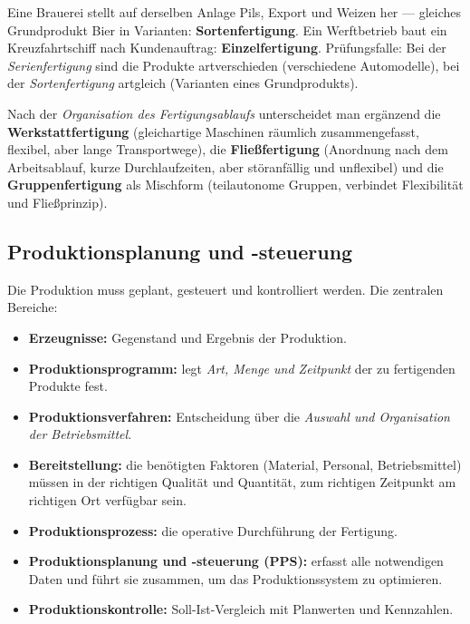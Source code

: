 \documentclass[11pt, a4paper]{article}
\begin{document}
\begin{beispiel}
Eine Brauerei stellt auf derselben Anlage Pils, Export und Weizen her --- gleiches
Grundprodukt Bier in Varianten: \textbf{Sortenfertigung}. Ein Werftbetrieb baut ein
Kreuzfahrtschiff nach Kundenauftrag: \textbf{Einzelfertigung}. Prüfungsfalle: Bei der
\emph{Serienfertigung} sind die Produkte artverschieden (verschiedene Automodelle), bei
der \emph{Sortenfertigung} artgleich (Varianten eines Grundprodukts).
\end{beispiel}

Nach der \emph{Organisation des Fertigungsablaufs} unterscheidet man ergänzend die
\textbf{Werkstattfertigung} (gleichartige Maschinen räumlich zusammengefasst, flexibel,
aber lange Transportwege), die \textbf{Fließfertigung} (Anordnung nach dem
Arbeitsablauf, kurze Durchlaufzeiten, aber störanfällig und unflexibel) und die
\textbf{Gruppenfertigung} als Mischform (teilautonome Gruppen, verbindet Flexibilität
und Fließprinzip).

\subsection{Produktionsplanung und -steuerung}

Die Produktion muss geplant, gesteuert und kontrolliert werden. Die zentralen Bereiche:

\begin{itemize}
  \item \textbf{Erzeugnisse:} Gegenstand und Ergebnis der Produktion.
  \item \textbf{Produktionsprogramm:} legt \emph{Art, Menge und Zeitpunkt} der zu
    fertigenden Produkte fest.
  \item \textbf{Produktionsverfahren:} Entscheidung über die \emph{Auswahl und
    Organisation der Betriebsmittel}.
  \item \textbf{Bereitstellung:} die benötigten Faktoren (Material, Personal,
    Betriebsmittel) müssen in der richtigen Qualität und Quantität, zum richtigen
    Zeitpunkt am richtigen Ort verfügbar sein.
  \item \textbf{Produktionsprozess:} die operative Durchführung der Fertigung.
  \item \textbf{Produktionsplanung und -steuerung (PPS):} erfasst alle notwendigen Daten
    und führt sie zusammen, um das Produktionssystem zu optimieren.
  \item \textbf{Produktionskontrolle:} Soll-Ist-Vergleich mit Planwerten und Kennzahlen.
\end{itemize}
\end{document}
